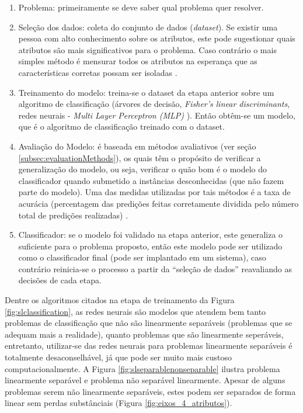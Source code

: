 \begin{enumerate}
\item Problema: primeiramente se deve saber qual problema quer resolver.
\item Seleção dos dados: coleta do conjunto de dados (\textit{dataset}). Se existir uma pessoa com alto conhecimento sobre os atributos, este pode sugestionar quais atributos são mais significativos para o problema. Caso contrário o mais simples método é mensurar todos os atributos na esperança que as características corretas possam ser isoladas \cite{Kotsiantis:2007}.
\item Treinamento do modelo: treina-se o dataset da etapa anterior sobre um algoritmo de classificação (árvores de decisão, \textit{Fisher’s linear discriminants}, redes neurais - \textit{Multi Layer Perceptron (MLP)} \cite{Michie:1994}). Então obtêm-se um modelo, que é o algoritmo de classificação treinado com o dataset.
\item Avaliação do Modelo: é baseada em métodos avaliativos (ver seção \ref{subsec:evaluationMethods}), os quais têm o propósito de verificar a generalização do modelo, ou seja, verificar o quão bom é o modelo do classificador quando submetido a instâncias desconhecidas (que não fazem parte do modelo). Uma das medidas utilizadas por tais métodos é a taxa de acurácia (percentagem das predições feitas corretamente dividida pelo número total de predições realizadas) \cite{Kotsiantis:2007}.
\item Classificador: se o modelo foi validado na etapa anterior, este generaliza o suficiente para o problema proposto, então este modelo pode ser utilizado como o classificador final (pode ser implantado em um sistema), caso contrário reinicia-se o processo a partir da ``seleção de dados'' reavaliando as decisões de cada etapa.
\end{enumerate}

Dentre os algoritmos citados na etapa de treinamento da Figura \ref{fig:slclassification}, as redes neurais são modelos que atendem bem tanto problemas de classificação que não são linearmente separáveis (problemas que se adequam mais a realidade), quanto problemas que são linearmente seperáveis, entretanto, utilizar-se das redes neurais para problemas linearmente separáveis é totalmente desaconselhável, já que pode ser muito mais custoso computacionalmente.\cite{Zhang:2000}\cite{Elizondo:2006} A Figura \ref{fig:slseparablenonseparable} ilustra problema linearmente separável e problema não separável linearmente. Apesar de alguns problemas serem não linearmente separáveis, estes podem ser separados de forma linear sem perdas substânciais (Figura \ref{fig:eixos_4_atributos}).


